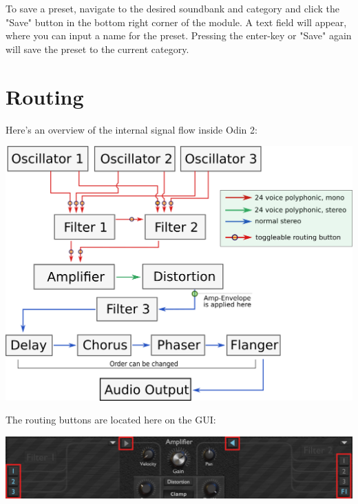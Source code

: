 To save a preset, navigate to the desired soundbank and category and click the "Save" button in the bottom right corner of the module. A text field will appear, where you can input a name for the preset. Pressing the enter-key or "Save" again will save the preset to the current category.

\clearpage
\section{Routing}
\label{routing}

Here's an overview of the internal signal flow inside Odin 2:
\begin{center}
    \includegraphics[width=\textwidth]{graphics/routing.png}
\end{center}


\vspace{1.5cm}
The routing buttons are located here on the GUI:
\begin{center}
    \includegraphics[width=\textwidth]{graphics/routing_buttons.png}
\end{center}


